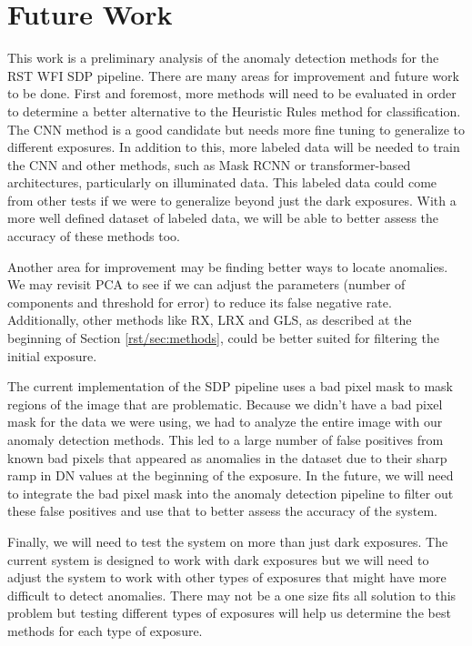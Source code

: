 \section{Future Work}
\label{rst/sec:future}
This work is a preliminary analysis of the anomaly detection methods for the RST WFI SDP pipeline.
There are many areas for improvement and future work to be done.
First and foremost, more methods will need to be evaluated in order to determine a better alternative to the Heuristic Rules method for classification. 
The CNN method is a good candidate but needs more fine tuning to generalize to different exposures.
In addition to this, more labeled data will be needed to train the CNN and other methods, such as Mask RCNN or transformer-based architectures, particularly on illuminated data.
This labeled data could come from other tests if we were to generalize beyond just the dark exposures.
With a more well defined dataset of labeled data, we will be able to better assess the accuracy of these methods too. 

Another area for improvement may be finding better ways to locate anomalies.
We may revisit PCA to see if we can adjust the parameters (number of components and threshold for error) to reduce its false negative rate.
Additionally, other methods like RX, LRX and GLS, as described at the beginning of Section \ref{rst/sec:methods}, could be better suited for filtering the initial exposure.

The current implementation of the SDP pipeline uses a bad pixel mask to mask regions of the image that are problematic. 
Because we didn't have a bad pixel mask for the data we were using, we had to analyze the entire image with our anomaly detection methods.
This led to a large number of false positives from known bad pixels that appeared as anomalies in the dataset due to their sharp ramp in DN values at the beginning of the exposure.
In the future, we will need to integrate the bad pixel mask into the anomaly detection pipeline to filter out these false positives and use that to better assess the accuracy of the system. 

Finally, we will need to test the system on more than just dark exposures.
The current system is designed to work with dark exposures but we will need to adjust the system to work with other types of exposures that might have more difficult to detect anomalies.
There may not be a one size fits all solution to this problem but testing different types of exposures will help us determine the best methods for each type of exposure.